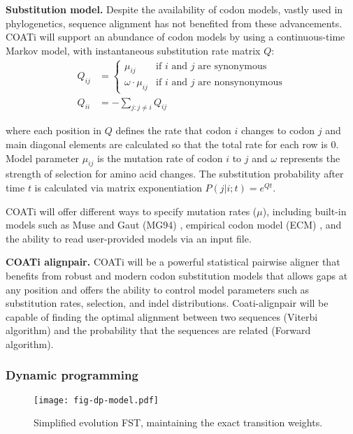 \textbf{Substitution model.}
Despite the availability of codon models, vastly used in phylogenetics, sequence
alignment has not benefited from these advancements.
COATi will support an abundance of codon models by using a continuous-time
Markov model, with instantaneous substitution rate matrix $Q$:
\begin{align*} Q_{ij} &= \begin{cases}
    \mu_{ij} & \text{if $i$ and $j$ are synonymous}\\
    \omega \cdot \mu_{ij} & \text{if $i$ and $j$ are nonsynonymous}
    \end{cases}\\[10pt]
   Q_{ii} &= -\sum_{j:j \neq i} Q_{ij}
\end{align*}

where each position in $Q$ defines the rate that codon $i$ changes to codon $j$
and main diagonal elements are calculated so that the total rate for each row
is 0.
Model parameter $\mu_{ij}$ is the mutation rate of codon $i$ to $j$ and $\omega$
represents the strength of selection for amino acid changes.
The substitution probability after time $t$ is calculated via matrix
exponentiation $P(j|i;t) = e^{Qt}$.

COATi will offer different ways to specify mutation rates ($\mu$), including
built-in models such as Muse and Gaut (MG94) \parencite{muse_gaut_1994},
empirical codon model (ECM) \parencite{kosiol_ECM_2007}, and the ability to read
user-provided models via an input file.

\textbf{COATi alignpair.}
COATi will be a powerful statistical pairwise aligner that benefits from
robust and modern codon substitution models that allows gaps at any position and
offers the ability to control model parameters such as substitution rates,
selection, and indel distributions.
Coati-alignpair will be capable of finding the optimal alignment between two
sequences (Viterbi
algorithm) and the probability that the sequences are related (Forward algorithm).

\vspace{1em}

\subsubsection{Dynamic programming}

\begin{wrapfigure}{r}{0.5\textwidth}
    \vspace{-3em}
    \centering
    \texttt{[image: fig-dp-model.pdf]}
    \caption{Simplified evolution FST, maintaining the exact transition weights.}
    \label{fig:dp-model}
\end{wrapfigure}

